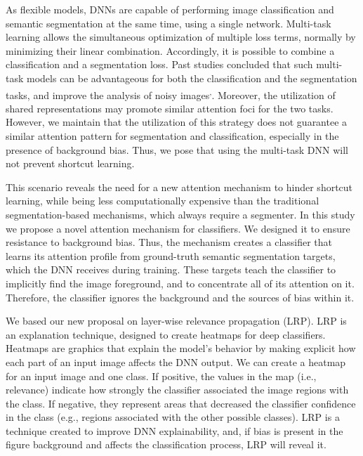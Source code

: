 \documentclass[fleqn,10pt]{wlscirep}
\begin{document}
As flexible models, DNNs are capable of performing image classification and semantic segmentation at the same time, using a single network. Multi-task learning\cite{MultiTaskOriginal} allows the simultaneous optimization of multiple loss terms, normally by minimizing their linear combination. Accordingly, it is possible to combine a classification and a segmentation loss. Past studies concluded that such multi-task models can be advantageous for both the classification and the segmentation tasks, and improve the analysis of noisy images\cite{MultiTask1}\textsuperscript{,}\cite{MultiTask2}. Moreover, the utilization of shared representations may promote similar attention foci for the two tasks\cite{MultiTask1}. However, we maintain that the utilization of this strategy does not guarantee a similar attention pattern for segmentation and classification, especially in the presence of background bias. Thus, we pose that using the multi-task DNN will not prevent shortcut learning.

This scenario reveals the need for a new attention mechanism to hinder shortcut learning, while being less computationally expensive than the traditional segmentation-based mechanisms, which always require a segmenter. In this study we propose a novel attention mechanism for classifiers. We designed it to ensure resistance to background bias. Thus, the mechanism creates a classifier that learns its attention profile from ground-truth semantic segmentation targets, which the DNN receives during training. These targets teach the classifier to implicitly find the image foreground, and to concentrate all of its attention on it. Therefore, the classifier ignores the background and the sources of bias within it.

We based our new proposal on layer-wise relevance propagation (LRP)\cite{LRP}. LRP is an explanation technique, designed to create heatmaps for deep classifiers. Heatmaps are graphics that explain the model's behavior by making explicit how each part of an input image affects the DNN output. We can create a heatmap for an input image and one class. If positive, the values in the map (i.e., relevance) indicate how strongly the classifier associated the image regions with the class. If negative, they represent areas that decreased the classifier confidence in the class (e.g., regions associated with the other possible classes). LRP is a technique created to improve DNN explainability, and, if bias is present in the figure background and affects the classification process, LRP will reveal it. 
\end{document}
